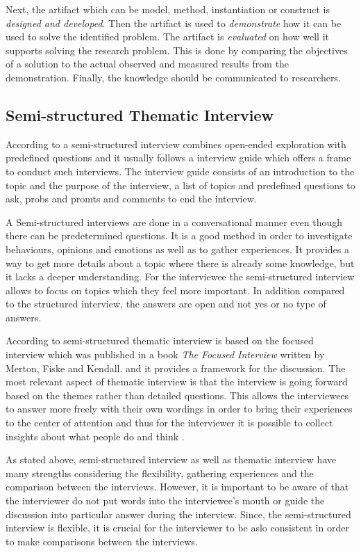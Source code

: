 Next, the artifact which can be model, method, instantiation or construct is \emph{designed and developed}. Then the artifact is used to \emph{demonstrate} how it can be used to solve the identified problem. The artifact is \emph{evaluated} on how well it supports solving the research problem. This is done by comparing the objectives of a solution to the actual observed and measured results from the demonstration. Finally, the knowledge should be communicated to researchers.

\subsection{Semi-structured Thematic Interview}

According to \textcite{Wilson:2013} a semi-structured interview combines open-ended exploration with predefined questions and it usually follows a interview guide which offers a frame to conduct such interviews. The interview guide consists of an introduction to the topic and the purpose of the interview, a list of topics and predefined questions to ask, probs and promts and comments to end the interview.

A Semi-structured interviews are done in a conversational manner even though there can be predetermined questions. It is a good method in order to investigate behaviours, opinions and emotions as well as to gather experiences. It provides a way to get more details about a topic where there is already some knowledge, but it lacks a deeper understanding. For the interviewee the semi-structured interview allows to focus on topics which they feel more important. In addition compared to the structured interview, the answers are open and not yes or no type of answers. \parencite{Cliffod:2010,Wilson:2013}

According to \textcite{HH:2001} semi-structured thematic interview is based on the focused interview which was published in a book \emph{The Focused Interview} written by Merton, Fiske and Kendall. and it provides a framework for the discussion. The most relevant aspect of thematic interview is that the interview is going forward based on the themes rather than detailed questions. This allows the interviewees to answer more freely with their own wordings in order to bring their experiences to the center of attention and thus for the interviewer it is possible to collect insights about what people do and think \parencite{Cliffod:2010}.

As stated above, semi-structured interview as well as thematic interview have many strengths considering the flexibility, gathering experiences and the comparison between the interviews. However, it is important to be aware of that the interviewer do not put words into the interviewee's mouth or guide the discussion into particular answer during the interview. Since, the semi-structured interview is flexible, it is crucial for the interviewer to be aslo consistent in order to make comparisons between the interviews. \parencite{Wilson:2013}

